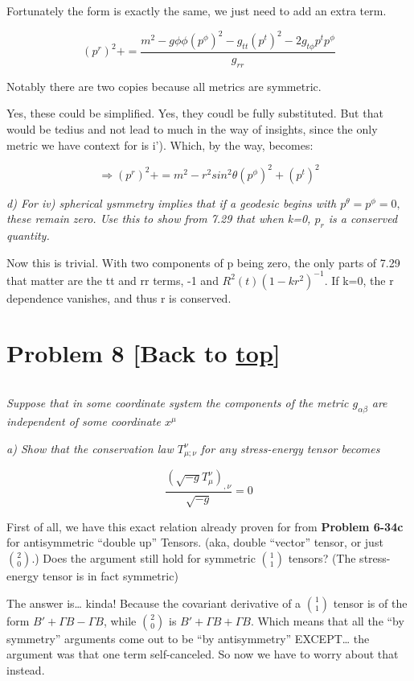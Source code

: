 \documentclass[landscape,letterpaper,10pt,english]{article}
\begin{document}
Fortunately the form is exactly the same, we just need to add an extra
term.

\[(p^r)^2 +  = \frac{m^2 - g{\phi\phi} (p^\phi)^2 - g_{tt} (p^t)^2 - 2g_{t\phi}p^tp^\phi}{g_{rr}} \]

Notably there are two copies because all metrics are symmetric.

Yes, these could be simplified. Yes, they coudl be fully substituted.
But that would be tedius and not lead to much in the way of insights,
since the only metric we have context for is i'). Which, by the way,
becomes:

\[\Rightarrow (p^r)^2 +  = m^2 - r^2sin^2\theta (p^\phi)^2 + (p^t)^2\]

    \emph{d) For iv) spherical ysmmetry implies that if a geodesic begins
with \(p^\theta = p^\phi = 0,\) these remain zero. Use this to show from
7.29 that when k=0, \(p_r\) is a conserved quantity.}

    Now this is trivial. With two components of p being zero, the only parts
of 7.29 that matter are the tt and rr terms, -1 and
\(R^2(t)(1-kr^2)^{-1}\). If k=0, the r dependence vanishes, and thus r
is conserved.

    \hypertarget{problem-8-back-to-top}{%
\section{\texorpdfstring{Problem 8 {[}Back to
\hyperref[toc]{top}{]}}{Problem 8 {[}Back to {]}}}\label{problem-8-back-to-top}}

\[\label{P8}\]

\emph{Suppose that in some coordinate system the components of the
metric \(g_{\alpha\beta}\) are independent of some coordinate \(x^\mu\)}

\emph{a) Show that the conservation law \(T^\nu_{\mu;\nu}\) for any
stress-energy tensor becomes}

\[ \frac{(\sqrt{-g} T^\nu_\mu)_{,\nu}}{\sqrt{-g}} = 0 \]

    First of all, we have this exact relation already proven for from
\textbf{Problem 6-34c} for antisymmetric ``double up'' Tensors. (aka,
double ``vector'' tensor, or just \(2\choose0\).) Does the argument
still hold for symmetric \(1\choose1\) tensors? (The stress-energy
tensor is in fact symmetric)

The answer is\ldots{} kinda! Because the covariant derivative of a
\(1\choose1\) tensor is of the form \(B' + \Gamma B - \Gamma B\), while
\(2\choose0\) is \(B' + \Gamma B + \Gamma B\). Which means that all the
``by symmetry'' arguments come out to be ``by antisymmetry''
EXCEPT\ldots{} the argument was that one term self-canceled. So now we
have to worry about that instead.
\end{document}
